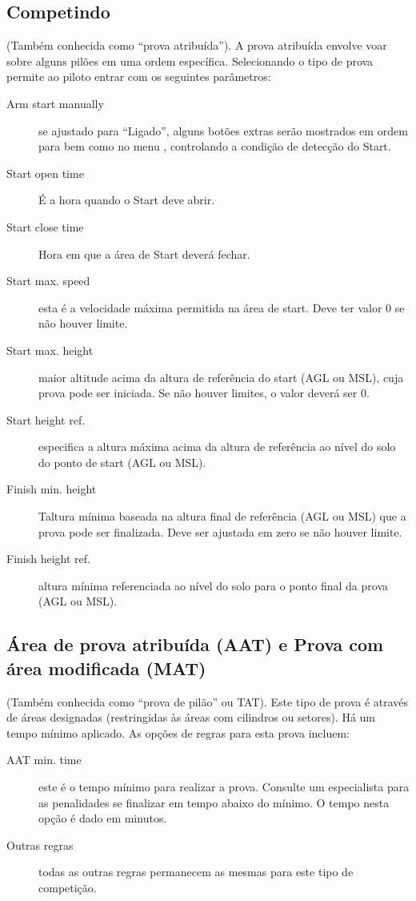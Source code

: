 \subsection*{Competindo}
(Também conhecida como “prova atribuída”).  A prova atribuída envolve voar sobre alguns pilões em uma ordem específica.  Selecionando o tipo de prova permite ao piloto entrar com os seguintes parâmetros: 
  \begin{description}
  \item [Arm start manually] se ajustado para “Ligado”, alguns botões extras serão mostrados em ordem para  bem como  no menu , controlando a condição de detecção do Start.
  \item [Start open time] É a hora quando o Start deve abrir. 
  \item [Start close time] Hora em que a área de Start deverá fechar.
  \item [Start max. speed] esta é a velocidade máxima permitida na área de start.  Deve ter valor 0 se não houver limite.
  \item [Start max. height] maior altitude acima da altura de referência do start (AGL ou MSL), cuja prova pode ser iniciada.  Se não houver limites, o valor deverá ser 0.
  \item [Start height ref.] especifica a altura máxima acima da altura de referência ao nível do solo do ponto de start (AGL ou MSL).
  \item [Finish min. height] Taltura mínima baseada na altura final de referência (AGL ou MSL) que a prova pode ser finalizada.  Deve ser ajustada em zero se não houver limite. 
  \item [Finish height ref.] altura mínima referenciada ao nível do solo para o ponto final da prova (AGL ou MSL).
  \end{description}
  
\subsection*{Área de prova atribuída (AAT) e Prova com área modificada (MAT)}
(Também conhecida como “prova de pilão” ou TAT).  Este tipo de prova é através de áreas designadas (restringidas às áreas com cilindros ou setores).  Há um tempo mínimo aplicado.  As opções de regras para esta prova incluem:
  \begin{description}
  \item [AAT min. time]  este é o tempo mínimo para realizar a prova. Consulte um especialista para as penalidades se finalizar em tempo abaixo do mínimo.  O tempo nesta opção é dado em minutos.
  \item [Outras regras] todas as outras regras permanecem as mesmas para este tipo de competição.
  \end{description}


